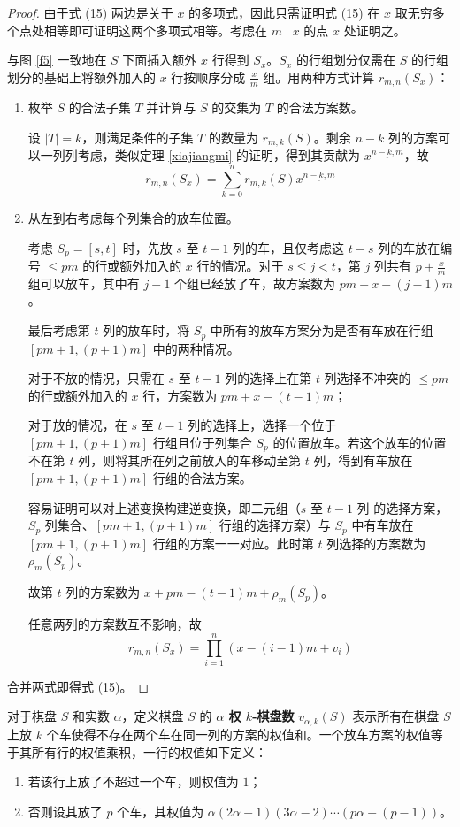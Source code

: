 \documentclass{noithesis}
\begin{document}
	\begin{proof}
		由于式 (15) 两边是关于 $x$ 的多项式，因此只需证明式 (15) 在 $x$ 取无穷多个点处相等即可证明这两个多项式相等。考虑在 $m \mid x$ 的点 $x$ 处证明之。
		
		与图 \ref{f5} 一致地在 $S$ 下面插入额外 $x$ 行得到 $S_x$。$S_x$ 的行组划分仅需在 $S$ 的行组划分的基础上将额外加入的 $x$ 行按顺序分成 $\frac{x}{m}$ 组。用两种方式计算 $r_{m,n}(S_x)$：
		\begin{enumerate}
			\item 枚举 $S$ 的合法子集 $T$ 并计算与 $S$ 的交集为 $T$ 的合法方案数。
			
			设 $|T| = k$，则满足条件的子集 $T$ 的数量为 $r_{m,k}(S)$。剩余 $n-k$ 列的方案可以一列列考虑，类似定理 \ref{xiajiangmi} 的证明，得到其贡献为 $x^{\underline{n-k,m}}$，故 $$r_{m,n}(S_x) = \sum_{k=0}^n r_{m,k}(S)x^{\underline{n-k,m}}$$
			\item 从左到右考虑每个列集合的放车位置。
			
			考虑 $S_p = [s,t]$ 时，先放 $s$ 至 $t-1$ 列的车，且仅考虑这 $t-s$ 列的车放在编号 $\leq pm$ 的行或额外加入的 $x$ 行的情况。对于 $s \leq j < t$，第 $j$ 列共有 $p+\frac{x}{m}$ 组可以放车，其中有 $j-1$ 个组已经放了车，故方案数为 $pm+x-(j-1)m$。
			
			最后考虑第 $t$ 列的放车时，将 $S_p$ 中所有的放车方案分为是否有车放在行组 $[pm+1,(p+1)m]$ 中的两种情况。
			
			对于不放的情况，只需在 $s$ 至 $t-1$ 列的选择上在第 $t$ 列选择不冲突的 $\leq pm$ 的行或额外加入的 $x$ 行，方案数为 $pm+x-(t-1)m$；
			
			对于放的情况，在 $s$ 至 $t-1$ 列的选择上，选择一个位于 $[pm+1,(p+1)m]$ 行组且位于列集合 $S_p$ 的位置放车。若这个放车的位置不在第 $t$ 列，则将其所在列之前放入的车移动至第 $t$ 列，得到有车放在 $[pm+1,(p+1)m]$ 行组的合法方案。
			
			容易证明可以对上述变换构建逆变换，即二元组（$s$ 至 $t-1$ 列 的选择方案，$S_p$ 列集合、$[pm+1,(p+1)m]$ 行组的选择方案）与 $S_p$ 中有车放在 $[pm+1,(p+1)m]$ 行组的方案一一对应。此时第 $t$ 列选择的方案数为 $\rho_m(S_p)$。
			
			故第 $t$ 列的方案数为 $x+pm-(t-1)m+\rho_m(S_p)$。
			
			任意两列的方案数互不影响，故 $$r_{m,n}(S_x) = \prod_{i=1}^n (x-(i-1)m+v_i)$$
			\end{enumerate}
			
			合并两式即得式 (15)。
	\end{proof}
	
	\begin{definition}\label{alpha}
		对于棋盘 $S$ 和实数 $\alpha$，定义棋盘 $S$ 的 \textbf{$\alpha$ 权 $k$-棋盘数} $v_{\alpha,k}(S)$ 表示所有在棋盘 $S$ 上放 $k$ 个车使得不存在两个车在同一列的方案的权值和。一个放车方案的权值等于其所有行的权值乘积，一行的权值如下定义：
		\begin{enumerate}
			\item 若该行上放了不超过一个车，则权值为 $1$；
			\item 否则设其放了 $p$ 个车，其权值为 $\alpha (2\alpha-1)(3\alpha-2)\cdots(p\alpha - (p-1))$。
		\end{enumerate}
	\end{definition}
	
\end{document}
